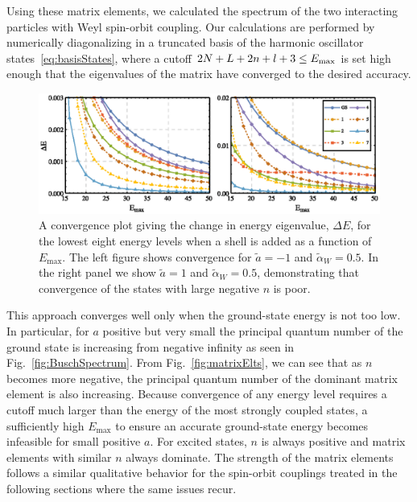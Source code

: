 Using these matrix elements, we calculated the spectrum of the two interacting particles with Weyl spin-orbit coupling. Our calculations are performed by numerically diagonalizing in a truncated basis of the harmonic oscillator states~\eqref{eq:basisStates}, where a cutoff $2N+L+\nobreak 2n+\nobreak l+ \nobreak3\leq\nobreak E_{\text{max}}$ is set high enough that the eigenvalues of the matrix have converged to the desired accuracy.  

\begin{figure}
\centering
\includegraphics{SOC/Figures/WeylConvergence}
\caption[Convergence of the energy eigenvalues for the Weyl spin-orbit coupling]{\label{fig:WeylConvergence}  A convergence plot giving the change in energy eigenvalue, $\Delta E$, for the lowest eight energy levels when a shell is added as a function of $E_{\text{max}}$.  The left figure shows convergence for $\tilde{a}=-1$ and $\tilde{\alpha}_W=0.5$. In the right panel  we show $\tilde{a}=1$ and $\tilde{\alpha}_W=0.5$, demonstrating that convergence of the states with large negative $n$ is poor.} 
\end{figure}

This approach converges well only when the ground-state energy is not too low. In particular, for $a$ positive but very small the principal quantum number of the ground state is increasing from negative infinity as seen in Fig.~\ref{fig:BuschSpectrum}. From Fig.~\ref{fig:matrixElts}, we can see that as $n$ becomes more negative, the principal quantum number of the dominant matrix element is also increasing. Because convergence of any energy level requires a cutoff much larger than the energy of the most strongly coupled states, a sufficiently high $E_{\text{max}}$ to ensure an accurate ground-state energy becomes infeasible for small positive $a$. For excited states, $n$ is always positive and matrix elements with similar $n$ always dominate. The strength of the matrix elements follows a similar qualitative behavior for the spin-orbit couplings treated in the following sections where the same issues recur. 

